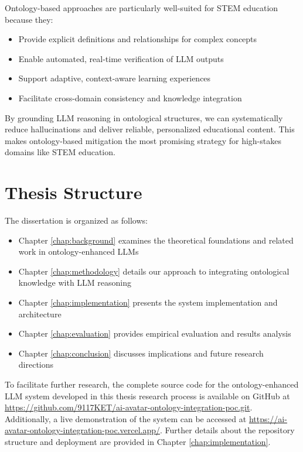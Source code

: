 
Ontology-based approaches are particularly well-suited for STEM education because they:
\begin{itemize}
    \item Provide explicit definitions and relationships for complex concepts
    \item Enable automated, real-time verification of LLM outputs
    \item Support adaptive, context-aware learning experiences
    \item Facilitate cross-domain consistency and knowledge integration
\end{itemize}

By grounding LLM reasoning in ontological structures, we can systematically reduce hallucinations and deliver reliable, personalized educational content. This makes ontology-based mitigation the most promising strategy for high-stakes domains like STEM education.


\section{Thesis Structure}

The dissertation is organized as follows:

\begin{itemize}
    \item Chapter \ref{chap:background} examines the theoretical foundations and related work in ontology-enhanced LLMs
    \item Chapter \ref{chap:methodology} details our approach to integrating ontological knowledge with LLM reasoning
    \item Chapter \ref{chap:implementation} presents the system implementation and architecture
    \item Chapter \ref{chap:evaluation} provides empirical evaluation and results analysis
    \item Chapter \ref{chap:conclusion} discusses implications and future research directions
\end{itemize}

To facilitate further research, the complete source code for the ontology-enhanced LLM system developed in this thesis research process is available on GitHub at \url{https://github.com/9117KET/ai-avatar-ontology-integration-poc.git}. Additionally, a live demonstration of the system can be accessed at \url{https://ai-avatar-ontology-integration-poc.vercel.app/}. Further details about the repository structure and deployment are provided in Chapter \ref{chap:implementation}.